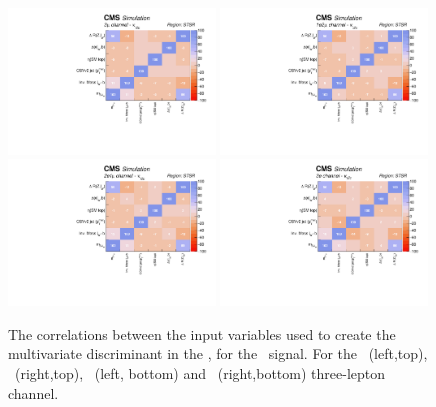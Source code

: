 \begin{figure}[htbp]
	\centering
	\includegraphics[width=0.49\textwidth]{6_Search/Figures/PlotsTechnics/correlationsigZctsingletopuuu}
	\includegraphics[width=0.49\textwidth]{6_Search/Figures/PlotsTechnics/correlationsigZctsingletopuue}
	\includegraphics[width=0.49\textwidth]{6_Search/Figures/PlotsTechnics/correlationsigZctsingletopeeu}
	\includegraphics[width=0.49\textwidth]{6_Search/Figures/PlotsTechnics/correlationsigZctsingletopeee}
	\caption{The correlations between the input variables used to create the multivariate discriminant in the \STSR, for the \Zct\ signal. For the \mumumu\ (left,top), \emumu\ (right,top), \eemu\ (left, bottom) and \eee\ (right,bottom) three-lepton channel.}
	\label{fig:correlationsigzctsingletop}
\end{figure}




